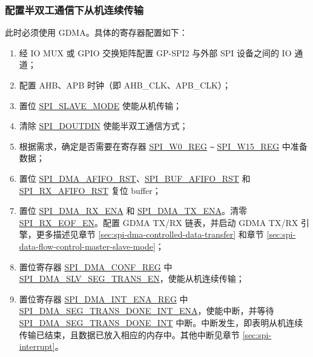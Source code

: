\documentclass[main\_\_CN.tex]{subfiles}
\begin{document}
\subsubsection{配置半双工通信下从机连续传输}\label{para:spi-slave-hd-seg-trans}

此时必须使用 GDMA。具体的寄存器配置如下：

\begin{enumerate}
   \item 经 IO MUX 或 GPIO 交换矩阵配置 GP-SPI2 与外部 SPI 设备之间的 IO 通道；

   \item 配置 AHB、APB 时钟（即 AHB\_CLK、APB\_CLK）；

    \item 置位 \hyperref[fielddesc:SPISLAVEMODE]{SPI\_SLAVE\_MODE} 使能从机传输；

    \item 清除 \hyperref[fielddesc:SPIDOUTDIN]{SPI\_DOUTDIN} 使能半双工通信方式；

    \item 根据需求，确定是否需要在寄存器 \hyperref[regdesc:SPIW0REG]{SPI\_W0\_REG} \verb+~+ \hyperref[regdesc:SPIW0REG]{SPI\_W15\_REG} 中准备数据；

    \item 置位 \hyperref[fielddesc:SPIDMAAFIFORST]{SPI\_DMA\_AFIFO\_RST}、\hyperref[fielddesc:SPIBUFAFIFORST]{SPI\_BUF\_AFIFO\_RST} 和 \hyperref[fielddesc:SPIRXAFIFORST]{SPI\_RX\_AFIFO\_RST} 复位 buffer；

    \item 置位 \hyperref[fielddesc:SPIDMARXENA]{SPI\_DMA\_RX\_ENA} 和 \hyperref[fielddesc:SPIDMATXENA]{SPI\_DMA\_TX\_ENA}。清零 \hyperref[fielddesc:SPIRXEOFEN]{SPI\_RX\_EOF\_EN}。配置 GDMA TX/RX 链表，并启动 GDMA TX/RX 引擎，更多描述见章节 \ref{sec:spi-dma-controlled-data-transfer} 和章节 \ref{sec:spi-data-flow-control-master-slave-mode}；

    \item 置位寄存器 \hyperref[regdesc:SPIDMACONFREG]{SPI\_DMA\_CONF\_REG} 中 \hyperref[fielddesc:SPIDMASLVSEGTRANSEN]{SPI\_DMA\_SLV\_SEG\_TRANS\_EN}，使能从机连续传输；

    \item 置位寄存器 \hyperref[regdesc:SPIDMAINTENAREG]{SPI\_DMA\_INT\_ENA\_REG} 中 \hyperref[fielddesc:SPIDMASEGTRANSDONEINTENA]{SPI\_DMA\_SEG\_TRANS\_DONE\_INT\_ENA}，使能中断，并等待 \hyperref[int:SPIDMASEGTRANSDONEINT]{SPI\_DMA\_SEG\_TRANS\_DONE\_INT} 中断。中断发生，即表明从机连续传输已结束，且数据已放入相应的内存中。其他中断见章节 \ref{sec:spi-interrupt}。
\end{enumerate}
\end{document}
